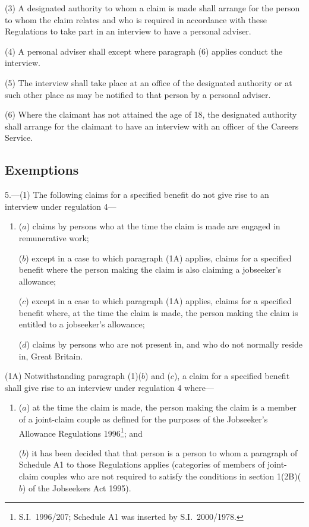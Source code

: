 \documentclass[12pt,a4paper]{article}
\begin{document}
(3) A designated authority to whom a claim is made shall arrange for the person to whom the claim relates and who is required in accordance with these Regulations to take part in an interview to have a personal adviser.

(4) A personal adviser shall except where paragraph (6) applies conduct the interview.

(5) The interview shall take place at an office of the designated authority or at such other place as may be notified to that person by a personal adviser.

(6) Where the claimant has not attained the age of 18, the designated authority shall arrange for the claimant to have an interview with an officer of the Careers Service.

\subsection[5. Exemptions]{Exemptions}

5.—(1)  The following claims for a specified benefit do not give rise to an interview under regulation 4—
\begin{enumerate}\item[]
($a$) claims by persons who at the time the claim is made are engaged in remunerative work;

($b$) 
except in a case to which paragraph (1A) applies,  %
claims for a specified benefit where the person making the claim is also claiming a jobseeker’s allowance;

($c$) 
except in a case to which paragraph (1A) applies,  %
claims for a specified benefit where, at the time the claim is made, the person making the claim is entitled to a jobseeker’s allowance;

($d$) claims by persons who are not present in, and who do not normally reside in, Great Britain.
\end{enumerate}

(1A) Notwithstanding paragraph (1)($b$)  and ($c$), a claim for a specified benefit shall give rise to an interview under regulation 4 where—
\begin{enumerate}\item[]
($a$) at the time the claim is made, the person making the claim is a member of a joint-claim couple as defined for the purposes of the Jobseeker’s Allowance Regulations 1996\footnote{S.I.\ 1996/207; Schedule A1 was inserted by S.I.\ 2000/1978.}; and

($b$) it has been decided that that person is a person to whom a paragraph of Schedule A1 to those Regulations applies (categories of members of joint-claim couples who are not required to satisfy the conditions in section 1(2B)($b$)  of the Jobseekers Act 1995).
\end{enumerate}
\end{document}
